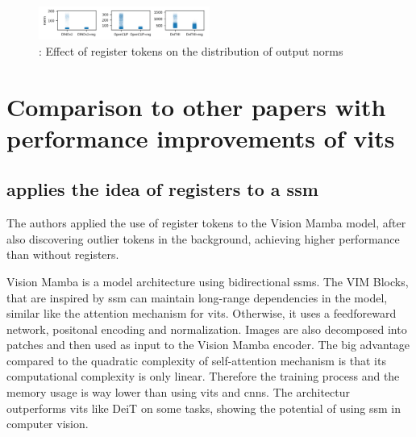 \documentclass[conference]{IEEEtran}
\begin{document}
  \begin{figure}
    \centering
    \includegraphics[width=0.5\textwidth]{figures/register-norm-result.png}
    \caption{: Effect of register tokens on the distribution of output norms \cite{registers}}
    \label{fig:register-norm-result}
  \end{figure}


  \section{Comparison to other papers with performance improvements of \ac{vit}s}

  \subsection{\cite{mamba-needs-registers} applies the idea of registers to a \ac{ssm}}
  The authors applied the use of register tokens to the Vision Mamba model, after also discovering outlier tokens in the background, achieving higher performance than without registers. 
  
  Vision Mamba \cite{vision-mamba} is a model architecture using bidirectional \acfp{ssm}. The VIM Blocks, that are inspired by \ac{ssm} can maintain long-range dependencies in the model, similar like the attention mechanism for \acp{vit}. Otherwise, it uses a feedforeward network, positonal encoding and normalization. Images are also decomposed into patches and then used as input to the Vision Mamba encoder. The big advantage compared to the quadratic complexity of self-attention mechanism is that its computational complexity is only linear. Therefore the training process and the memory usage is way lower than using \acp{vit} and \acp{cnn}. The architectur outperforms \acp{vit} like DeiT \cite{deit} on some tasks, showing the potential of using \ac{ssm} in computer vision. \cite{vision-mamba} \cite{mamba-needs-registers}
  
\end{document}
